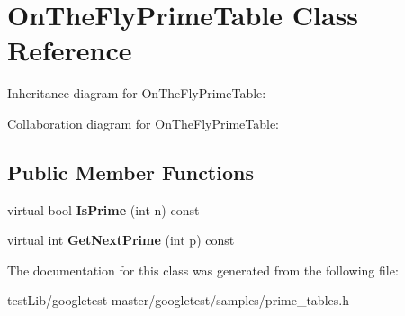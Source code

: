 \hypertarget{classOnTheFlyPrimeTable}{}\section{On\+The\+Fly\+Prime\+Table Class Reference}
\label{classOnTheFlyPrimeTable}


Inheritance diagram for On\+The\+Fly\+Prime\+Table\+:


Collaboration diagram for On\+The\+Fly\+Prime\+Table\+:
\subsection*{Public Member Functions}
\begin{DoxyCompactItemize}
\item 
\mbox{\label{classOnTheFlyPrimeTable_a1d49b78f79e018441289e79d75680067}} 
virtual bool {\bfseries Is\+Prime} (int n) const
\item 
\mbox{\label{classOnTheFlyPrimeTable_a5a4644fedd95d33136723f33b9302bfc}} 
virtual int {\bfseries Get\+Next\+Prime} (int p) const
\end{DoxyCompactItemize}


The documentation for this class was generated from the following file\+:\begin{DoxyCompactItemize}
\item 
test\+Lib/googletest-\/master/googletest/samples/prime\+\_\+tables.\+h\end{DoxyCompactItemize}
